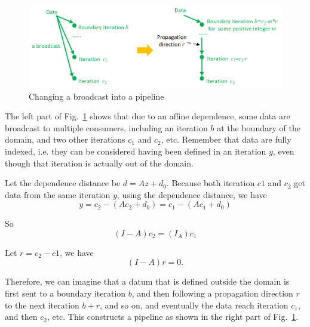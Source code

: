 \begin{figure}[!ht]
    \centering
    \includegraphics[width=\textwidth]{./img/broadcast-to-pipeline.png}
    \caption{Changing a broadcast into a pipeline}
    \label{fig:broadcast-to-pipeline}
\end{figure}

The left part of Fig.~\ref{fig:broadcast-to-pipeline} shows that due to an affine dependence, some data are broadcast to multiple consumers, including an iteration $b$ at the boundary of the domain, and two other iterations $c_1$ and $c_2$, etc. Remember that data are fully indexed, i.e. they can be considered having been defined in an iteration $y$, even though that iteration is actually out of the domain. 

Let the dependence distance be $d=Az+d_0$.  Because both iteration $c1$ and $c_2$ get data from the same iteration $y$, using the  dependence distance, we have
\begin{equation}
y = c_2 - (Ac_2+d_0) = c_1 - (Ac_1+d_0)
\end{equation}

So
\begin{equation}
(I-A)c_2 = (I_A)c_1    
\end{equation}

Let $r=c_2-c1$, we have
\begin{equation}
(I-A)r = 0.
\end{equation}

Therefore, we can imagine that a datum that is defined outside the domain is first sent to a boundary iteration $b$, and then following a propagation direction $r$ to the next iteration $b+r$, and so on, and eventually the data reach iteration $c_1$, and then $c_2$, etc. This constructs a pipeline as shown in the right part of Fig.~\ref{fig:broadcast-to-pipeline}.

